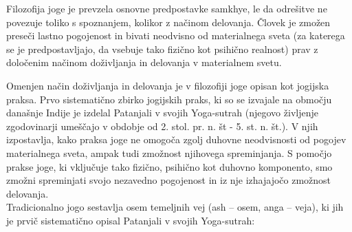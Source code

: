 \documentclass[a4paper, 12pt]{book}
\begin{document}
Filozofija joge je prevzela osnovne predpostavke samkhye, le da odrešitve ne povezuje toliko s spoznanjem, kolikor z načinom delovanja. Človek je zmožen preseči lastno pogojenost in bivati neodvisno od materialnega sveta (za katerega se je predpostavljajo, da vsebuje tako fizično kot psihično realnost) prav z določenim načinom doživljanja in delovanja v materialnem svetu.

Omenjen način doživljanja in delovanja je v filozofiji joge opisan kot jogijska praksa. Prvo sistematično zbirko jogijskih praks, ki so se izvajale na območju današnje Indije je izdelal Patanjali v svojih Yoga-sutrah (njegovo življenje zgodovinarji umeščajo v obdobje od 2. stol. pr. n. št - 5. st. n. št.). V njih izpostavlja, kako praksa joge ne omogoča zgolj duhovne neodvisnosti od pogojev materialnega sveta, ampak tudi zmožnost njihovega spreminjanja. S pomočjo prakse joge, ki vključuje tako fizično, psihično kot duhovno komponento, smo zmožni spreminjati svojo nezavedno pogojenost in iz nje izhajajočo zmožnost delovanja.\\


Tradicionalno jogo sestavlja osem temeljnih vej (ash – osem, anga – veja), ki jih je prvič sistematično opisal Patanjali v svojih Yoga-sutrah:
\end{document}
